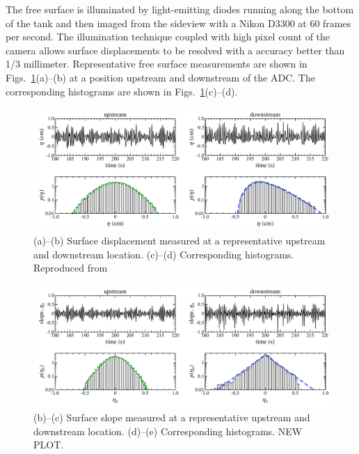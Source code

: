 \documentclass[11pt]{article}
\begin{document}
	The free surface is illuminated by light-emitting diodes running along the bottom of the tank and then imaged from the sideview with a Nikon D3300 at 60 frames per second. The illumination technique coupled with high pixel count of the camera allows surface displacements to be resolved with a accuracy better than 1/3 millimeter. Representative free surface measurements are shown in Figs.~\ref{fig2}(a)--(b) at a position upstream and downstream of the ADC. The corresponding histograms are shown in Figs.~\ref{fig2}(c)--(d).


\begin{figure}%
\begin{center}
\includegraphics[width = 0.85 \linewidth]{Figs/fig2.pdf}
\caption{
(a)--(b) Surface displacement measured at a representative upstream and downstream location. (c)--(d) Corresponding histograms. Reproduced from \cite{bolles2019anomalous}
}
\label{fig2}
\end{center}
\end{figure}
 
\begin{figure}%
\begin{center}
\includegraphics[width = 0.85 \linewidth]{Figs/fig3.pdf}
\caption{
(b)--(c) Surface slope measured at a representative upstream and downstream location. (d)--(e) Corresponding histograms. NEW PLOT.
}
\label{fig3}
\end{center}
\end{figure}
 
\end{document}
